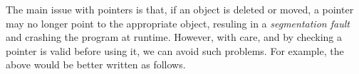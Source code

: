 The main issue with pointers is that, if an object is deleted or moved, a pointer may no longer point to the appropriate object, resuling in a \emph{segmentation fault} and crashing the program at runtime. However, with care, and by checking a pointer is valid before using it, we can avoid such problems. For example, the above would be better written as follows.
\begin{knitrout}\small
{}\color{fgcolor}\begin{kframe}
\noindent
\ttfamily
{}\hlopt{{*}\ }\hlopt{=\ }\hlstd{}\hlstd{}\hlopt{();}\hspace*{\fill}\\
\hlstd{}\hlstd{}\hlopt{(}\hlopt{==\ }\hlstd{}\hlstd{}\hlopt{)\ }\hlstd{}\hlstd{}\hlopt{();}\hspace*{\fill}\\
\hlopt{{*}\ }\hlopt{=\ }\hlopt{{-}$>$}\hlstd{}\hlstd{}\hlopt{();}\hspace*{\fill}\\
\hlstd{}\hlstd{}\hlopt{(}\hlopt{==\ }\hlstd{}\hlstd{}\hlopt{)\ }\hlstd{}\hlstd{}\hlopt{();}\hspace*{\fill}\\
\hlstd{}\hlstd{}\hlopt{(}\hlopt{{-}$>$}\hlstd{}\hlstd{}\hlopt{()\ $<$=\ }\hlopt{)\ }\hlstd{}\hlstd{}\hlopt{();}\hspace*{\fill}\\
\hlopt{{*}\ }\hlopt{=\ }\hlopt{{-}$>$}\hlstd{}\hlstd{}\hlopt{(}\hlopt{){-}$>$}\hlstd{}\hlstd{}\hlopt{();}\hspace*{\fill}\\
\hlstd{}\hlstd{}\hlopt{(}\hlopt{==\ }\hlstd{}\hlstd{}\hlopt{)\ }\hlstd{}\hlstd{}\hlopt{();}\hspace*{\fill}\\
\hlopt{{-}$>$}\hlstd{}\hlstd{}\hlopt{(}\hlopt{,\ }\hlopt{);}\hlstd{}\hspace*{\fill}
\mbox{}
\normalfont
\end{kframe}
\end{knitrout}

